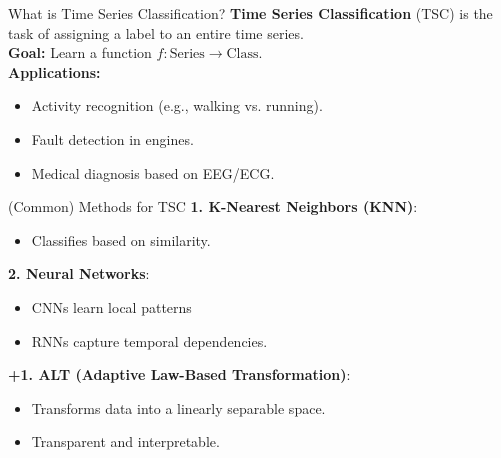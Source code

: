 \documentclass{beamer}
\begin{document}
\begin{frame}{What is Time Series Classification?}
  \textbf{Time Series Classification} (TSC) is the task of assigning a label to an entire time series.
  \\[1em]
  \textbf{Goal:} Learn a function \( f: \text{Series} \rightarrow \text{Class} \).
  \\[1em]
  \textbf{Applications:}
  \begin{itemize}
    \item Activity recognition (e.g., walking vs. running).
    \item Fault detection in engines.
    \item Medical diagnosis based on EEG/ECG.
  \end{itemize}
\end{frame}

\begin{frame}{(Common) Methods for TSC}
  \textbf{1. K-Nearest Neighbors (KNN)}:
  \begin{itemize}
    \item Classifies based on similarity.
  \end{itemize}
  \textbf{2. Neural Networks}:
  \begin{itemize}
    \item CNNs learn local patterns
    \item RNNs capture temporal dependencies.
  \end{itemize}
  \textbf{+1. ALT (Adaptive Law-Based Transformation)}\cite{kurbucz2025adaptive, halmos2025alt}:
  \begin{itemize}
    \item Transforms data into a linearly separable space.
    \item Transparent and interpretable.
  \end{itemize}
\end{frame}
\end{document}
